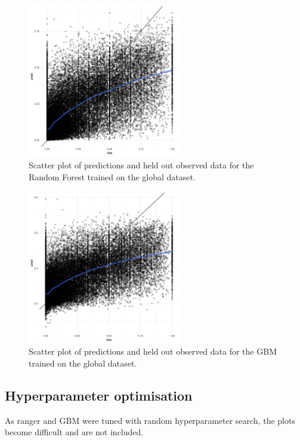 \documentclass[review]{elsarticle}
\begin{document}
\begin{figure}[h!]
  \centering
  \includegraphics[width=0.6\textwidth]{figs/SI/ranger_obspred_global.png}
\caption{
  Scatter plot of predictions and held out observed data for the Random Forest trained on the global dataset.
}

\end{figure}


\begin{figure}[h!]
  \centering
  \includegraphics[width=0.6\textwidth]{figs/SI/gbm_obspred_global.png}
\caption{
  Scatter plot of predictions and held out observed data for the GBM trained on the global dataset.
}

\end{figure}


\clearpage
\subsection{Hyperparameter optimisation}

As ranger and GBM were tuned with random hyperparameter search, the plots become difficult and are not included.
\end{document}
